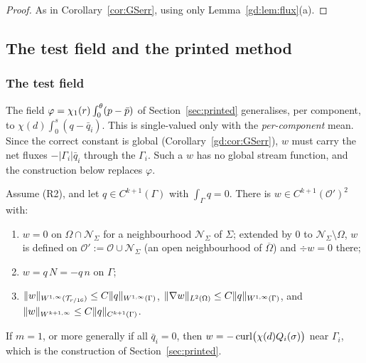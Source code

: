 \begin{proof}
As in Corollary~\ref{cor:GSerr}, using only Lemma~\ref{gd:lem:flux}(a).
\end{proof}

\subsection{The test field and the printed method}\label{gd:sec:test}

\subsubsection{The test field}
The field $\varphi=\chi_1(r)\int_0^\theta(p-\bar p)$ of Section~\ref{sec:printed} generalises, per component, to $\chi(d)\int_0^s(q-\bar q_i)$. This is single-valued only with the \emph{per-component} mean. Since the correct constant is global (Corollary~\ref{gd:cor:GSerr}), $w$ must carry the net fluxes $-|\Gamma_i|\bar q_i$ through the $\Gamma_i$. Such a $w$ has no global stream function, and the construction below replaces $\varphi$.

\begin{lemma}\label{gd:lem:w}
Assume (R2), and let $q\in C^{k+1}(\Gamma)$ with $\int_\Gamma q=0$. There is $w\in C^{k+1}(\mathcal O')^2$ with:
\begin{enumerate}[label=(\alph*)]
\item $w=0$ on $\Omega\cap\mathcal N_\Sigma$ for a neighbourhood $\mathcal N_\Sigma$ of $\Sigma$; extended by $0$ to $\mathcal N_\Sigma\setminus\Omega$, $w$ is defined on $\mathcal O':=\mathcal O\cup\mathcal N_\Sigma$ (an open neighbourhood of $\overline\Omega$) and $\div w=0$ there;
\item $w=q\,N=-q\,n$ on $\Gamma$;
\item $\lVert w\rVert_{W^{1,\infty}(\mathcal T_{r/16})}\le C\lVert q\rVert_{W^{1,\infty}(\Gamma)}$, $\lVert \nabla w\rVert_{L^2(\Omega)}\le C\lVert q\rVert_{W^{1,\infty}(\Gamma)}$, and $\lVert w\rVert_{W^{k+1,\infty}}\le C\lVert q\rVert_{C^{k+1}(\Gamma)}$.
\end{enumerate}
If $m=1$, or more generally if all $\bar q_i=0$, then $w=-\operatorname{curl}\bigl(\chi(d)Q_i(\sigma)\bigr)$ near $\Gamma_i$, which is the construction of Section~\ref{sec:printed}.
\end{lemma}

